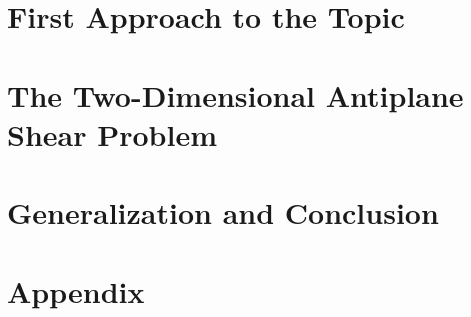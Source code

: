 
\addtolength{\evensidemargin}{-12mm}

%
%
\part[Introduction and Background Theory]{First Approach to the Topic}
\label{part:introAndBackgroundTheory}


\part[Body: What was done for the thesis]{The Two-Dimensional Antiplane Shear Problem}
\label{part:body}




\part[Results and Conclusion]{Generalization and Conclusion}
\label{part:resultsAndConclusion}


%
%
\part*{Appendix}

\appendix %



